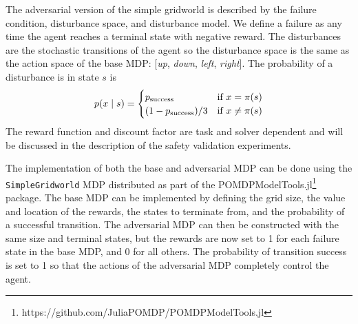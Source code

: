 The adversarial version of the simple gridworld is described by the failure condition, disturbance space, and disturbance model.  We define a failure as any time the agent reaches a terminal state with negative reward. The disturbances are the stochastic transitions of the agent so the disturbance space is the same as the action space of the base MDP: [\emph{up}, \emph{down}, \emph{left}, \emph{right}]. The probability of a disturbance is in state $s$ is
\begin{equation}
    p(x \mid s) = \begin{cases}
    p_{\rm success} & \text{if } x = \pi(s) \\
    (1 - p_{\rm success}) / 3 & \text{if } x \neq \pi(s) \\ 
    \end{cases}
\end{equation}
The reward function and discount factor are task and solver dependent and will be discussed in the description of the safety validation experiments. 

The implementation of both the base and adversarial MDP can be done using the \texttt{SimpleGridworld} MDP distributed as part of the POMDPModelTools.jl\footnote{https://github.com/JuliaPOMDP/POMDPModelTools.jl} package. The base MDP can be implemented by defining the grid size, the value and location of the rewards, the states to terminate from, and the probability of a successful transition. The adversarial MDP can then be constructed with the same size and terminal states, but the rewards are now set to \num{1} for each failure state in the base MDP, and \num{0} for all others. The probability of transition success is set to \num{1} so that the actions of the adversarial MDP completely control the agent.



